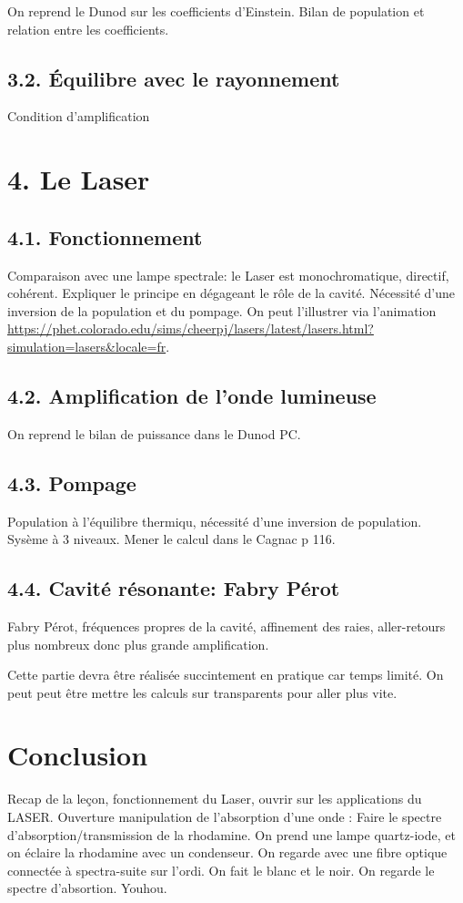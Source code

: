 \documentclass[french, a4paper, 10pt, twocolumn, landscape]{article}
\begin{document}
On reprend le Dunod sur les coefficients d'Einstein.
Bilan de population et relation entre les coefficients.

\subsection*{3.2. Équilibre avec le rayonnement }
Condition d'amplification 


\section*{4. Le Laser}

\subsection*{4.1. Fonctionnement}
Comparaison avec une lampe spectrale: le Laser est monochromatique, directif, cohérent. Expliquer le principe en dégageant le rôle de la cavité. Nécessité d'une inversion de la population et du pompage. On peut l'illustrer via l'animation \url{https://phet.colorado.edu/sims/cheerpj/lasers/latest/lasers.html?simulation=lasers&locale=fr}.

\subsection*{4.2. Amplification de l'onde lumineuse}

On reprend le bilan de puissance dans le Dunod PC.

\subsection*{4.3. Pompage}

Population à l'équilibre thermiqu, nécessité d'une inversion de population. Sysème à 3 niveaux. Mener le calcul dans le Cagnac p 116.

\subsection*{4.4. Cavité résonante: Fabry Pérot}

Fabry Pérot, fréquences propres de la cavité, affinement des raies, aller-retours plus nombreux donc plus grande amplification.

Cette partie devra être réalisée succintement en pratique car temps limité. On peut peut être mettre les calculs sur transparents pour aller plus vite. 

\section*{Conclusion}

Recap de la leçon, fonctionnement du Laser, ouvrir sur les applications du LASER. Ouverture manipulation de l'absorption d'une onde : Faire le spectre d'absorption/transmission de la rhodamine. On prend une lampe quartz-iode, et on éclaire la rhodamine avec un condenseur. On regarde avec une fibre optique connectée à spectra-suite sur l'ordi. On fait le blanc et le noir. On regarde le spectre d'absortion. Youhou.
\end{document}
